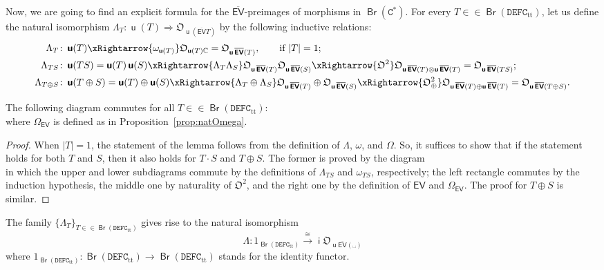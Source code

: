 \documentclass[10pt]{simplearticle}
\newcommand{\tikzinput}[1]{}
\newcommand{\DEFC}{\mathbb{\mathtt{DEFC}}}
\newcommand{\Cstar}{\mathtt{C^{*}}}
\newcommand{\mathsb}[1]{\boldsymbol{\mathsf{#1}}}
\newcommand{\mmph}{\text{{␣}}}
\newcommand{\Br}{\operatorname{\mathsb{Br}}}
\renewcommand{\i}{\operatorname{\mathsb i}}
\renewcommand{\u}{\operatorname{\mathsb u}}
\newcommand{\EV}{\mathsb{EV}}
\newcommand{\ttt}{\operatorname{tt}}
\begin{document}
Now, we are going to find an explicit formula for the $\overline{\EV}$-preimages
of morphisms in $\Br(\Cstar)$. For every $T\in\in\Br(\DEFC_{\ttt})$,
let us define the natural isomorphism $\Lambda_{T}\colon\u(T)\Rightarrow\mathfrak{O}_{\u(\overline{\EV}T)}$
by the following inductive relations:
\begin{alignat*}{1}
\Lambda_{T}\colon & \u(T)\xRightarrow{\omega_{\u(T)}}\mathfrak{O}_{\u(T)\mathbb{C}}=\mathfrak{O}_{\u\overline{\EV}(T)},\qquad\textrm{if }|T|=1;\\
\Lambda_{TS}\colon & \u(TS)=\u(T)\u(S)\xRightarrow{\Lambda_{T}\Lambda_{S}}\mathfrak{O}_{\u\overline{\EV}(T)}\mathfrak{O}_{\u\overline{\EV}(S)}\xRightarrow{\mathfrak{O}^{2}}\mathfrak{O}_{\u\overline{\EV}(T)\otimes\u\overline{\EV}(T)}=\mathfrak{O}_{\u\overline{\EV}(TS)};\\
\Lambda_{T\oplus S}\colon & \u(T\oplus S)=\u(T)\oplus\u(S)\xRightarrow{\Lambda_{T}\oplus\Lambda_{S}}\mathfrak{O}_{\u\overline{\EV}(T)}\oplus\mathfrak{O}_{\u\overline{\EV}(S)}\xRightarrow{\mathfrak{O}^{2}_{\oplus}}\mathfrak{O}_{\u\overline{\EV}(T)\oplus\u\overline{\EV}(T)}=\mathfrak{O}_{\u\overline{\EV}(T\oplus S)}.
\end{alignat*}

\begin{lem}\label{lem:ba}
The following diagram commutes for all $T\in\in\Br(\DEFC_{\ttt})$:
\[
\tikzinput{d439}
\]
where $\Omega_{\EV}$ is defined as in Proposition~\ref{prop:natOmega}.
\end{lem}

\begin{proof}
When $|T|=1$, the statement of the lemma follows from the definition
of $\Lambda$, $\omega$, and $\Omega$. So, it suffices to show that
if the statement holds for both $T$ and $S$, then it also holds
for $T\cdot S$ and $T\oplus S$. The former is proved by the diagram
\[
\tikzinput{d473}
\]
in which the upper and lower subdiagrams commute by the definitions
of $\Lambda_{TS}$ and $\omega_{TS}$, respectively; the left rectangle
commutes by the induction hypothesis, the middle one by naturality
of $\mathfrak{O}^{2}$, and the right one by the definition of $\EV$
and $\Omega_{\EV}$. The proof for $T\oplus S$ is similar.
\end{proof}

\begin{prop}\label{prop:bb}
The family $\{\Lambda_{T}\}_{T\in\in\Br(\DEFC_{\ttt})}$
gives rise to the natural isomorphism
\[
\Lambda\colon1_{\Br(\DEFC_{\ttt})}\xrightarrow{\cong}\i\mathfrak{O}_{\u\overline{\EV}(\mmph)}
\]
where $1_{\Br(\DEFC_{\ttt})}\colon\Br(\DEFC_{\ttt})\to\Br(\DEFC_{\ttt})$
stands for the identity functor.
\end{prop}
\end{document}
